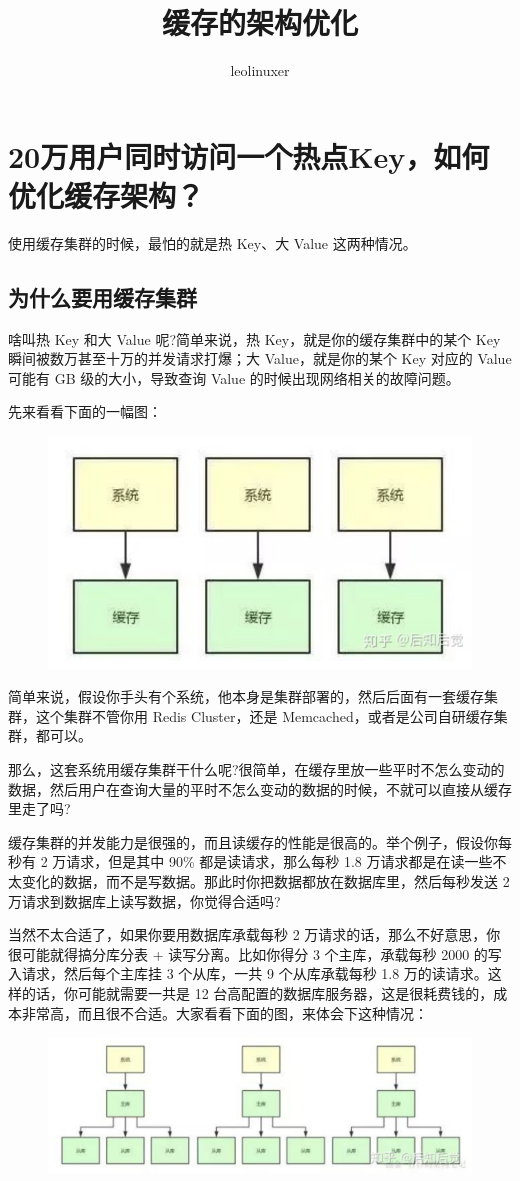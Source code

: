 \documentclass[12pt]{article}
\title{缓存的架构优化}
\author{leolinuxer}
\begin{document}
\maketitle
\tableofcontents

\section{20万用户同时访问一个热点Key，如何优化缓存架构？\cite{Optimize_Cache_Infrastructure}}
使用缓存集群的时候，最怕的就是热 Key、大 Value 这两种情况。

\subsection{为什么要用缓存集群}
啥叫热 Key 和大 Value 呢?简单来说，热 Key，就是你的缓存集群中的某个 Key 瞬间被数万甚至十万的并发请求打爆；大 Value，就是你的某个 Key 对应的 Value 可能有 GB 级的大小，导致查询 Value 的时候出现网络相关的故障问题。

先来看看下面的一幅图：
\begin{figure}[H]
    \centering
    \includegraphics[width=.5\textwidth]{fig/Cache_Infrastructure_Hot_Key_1.png}
\end{figure}

简单来说，假设你手头有个系统，他本身是集群部署的，然后后面有一套缓存集群，这个集群不管你用 Redis Cluster，还是 Memcached，或者是公司自研缓存集群，都可以。

那么，这套系统用缓存集群干什么呢?很简单，在缓存里放一些平时不怎么变动的数据，然后用户在查询大量的平时不怎么变动的数据的时候，不就可以直接从缓存里走了吗?

缓存集群的并发能力是很强的，而且读缓存的性能是很高的。举个例子，假设你每秒有 2 万请求，但是其中 90\% 都是读请求，那么每秒 1.8 万请求都是在读一些不太变化的数据，而不是写数据。那此时你把数据都放在数据库里，然后每秒发送 2 万请求到数据库上读写数据，你觉得合适吗?

当然不太合适了，如果你要用数据库承载每秒 2 万请求的话，那么不好意思，你很可能就得搞分库分表 + 读写分离。比如你得分 3 个主库，承载每秒 2000 的写入请求，然后每个主库挂 3 个从库，一共 9 个从库承载每秒 1.8 万的读请求。这样的话，你可能就需要一共是 12 台高配置的数据库服务器，这是很耗费钱的，成本非常高，而且很不合适。大家看看下面的图，来体会下这种情况：
\begin{figure}[H]
    \centering
    \includegraphics[width=.6\textwidth]{fig/Cache_Infrastructure_Hot_Key_2.png}
\end{figure}
\end{document}
